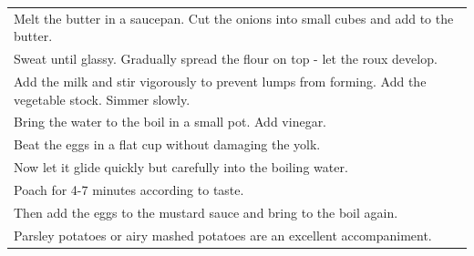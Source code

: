 \begin{tabular}{p{15cm}}
	\\
  Melt the butter in a saucepan. Cut the onions into small cubes and add to the butter.\\
  Sweat until glassy. Gradually spread the flour on top - let the roux develop.\\
  Add the milk and stir vigorously to prevent lumps from forming. Add the vegetable stock. Simmer slowly.\\
  Bring the water to the boil in a small pot. Add vinegar.\\
  Beat the eggs in a flat cup without damaging the yolk.\\
  Now let it glide quickly but carefully into the boiling water.\\
  Poach for 4-7 minutes according to taste.\\
  Then add the eggs to the mustard sauce and bring to the boil again.\\
  Parsley potatoes or airy mashed potatoes are an excellent accompaniment.
\end{tabular}
